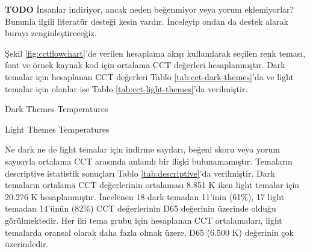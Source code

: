 \documentclass{article}
\begin{document}
\textbf{TODO} İnsanlar indiriyor, ancak neden beğenmiyor veya yorum eklemiyorlar? Bununla ilgili literatür desteği kesin
vardır. İnceleyip ondan da destek alarak burayı zenginleştireceğiz.

Şekil \ref{fig:cctflowchart}'de verilen hesaplama akışı kullanılarak seçilen renk teması, font ve örnek kaynak kod için
ortalama CCT değerleri hesaplanmıştır. Dark temalar için hesaplanan CCT değerleri Tablo \ref{tab:cct-dark-themes}'da ve
light temalar için olanlar ise Tablo \ref{tab:cct-light-themes}'da verilmiştir.


\begin{table}[H]

	\caption{Dark Themes Temperatures}
  \label{tab:cct-dark-themes}
\end{table}

\begin{table}[H]

	\caption{Light Themes Temperatures}
  \label{tab:cct-light-themes}
\end{table}

Ne dark ne de light temalar için indirme sayıları, beğeni skoru veya yorum sayısıyla ortalama CCT arasında anlamlı bir
ilişki bulunamamıştır. Temaların descriptive istatistik sonuçları Tablo \ref{tab:descriptive}'da verilmiştir. Dark
temaların ortalama CCT değerlerinin ortalaması 8.851 K iken light temalar için 20.276 K hesaplanmıştır. İncelenen 18
dark temadan 11'inin (61\%), 17 light temadan 14'ünün (82\%) CCT değerlerinin D65 değerinin üzerinde olduğu
görülmektedir. Her iki tema grubu için hesaplanan CCT ortalamaları, light temalarda oransal olarak daha fazla olmak
üzere, D65 (6.500 K) değerinin çok üzerindedir.  
\end{document}
